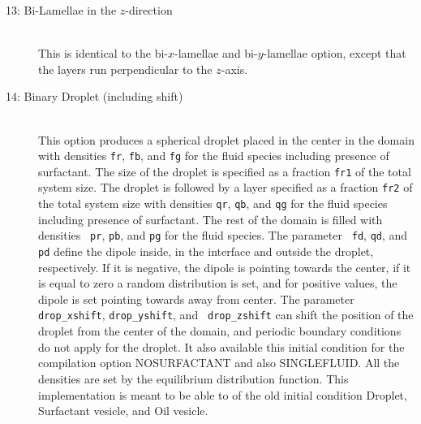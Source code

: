 \documentclass[a4paper]{article}
\begin{document}
\begin{description}
\item[13: Bi-Lamellae in the $z$-direction]\ \\
  This is identical to the bi-$x$-lamellae and bi-$y$-lamellae option, except
  that the layers run perpendicular to the $z$-axis.

\item[14: Binary Droplet (including shift)]\ \\
  This option produces a spherical droplet placed in the center in the domain
  with densities {\tt fr}, {\tt fb}, and {\tt fg} for the fluid species
  including presence of surfactant. The size of the droplet is specified as a
  fraction {\tt fr1} of the total system size. The droplet is followed by a
  layer specified as a fraction {\tt fr2} of the total system size with
  densities {\tt qr}, {\tt qb}, and {\tt qg} for the fluid species including
  presence of surfactant. The rest of the domain is filled with densities {\tt
    pr}, {\tt pb}, and {\tt pg} for the fluid species.  The parameter {\tt
    fd}, {\tt qd}, and {\tt pd} define the dipole inside, in the interface and
  outside the droplet, respectively. If it is negative, the dipole is pointing
  towards the center, if it is equal to zero a random distribution is set, and
  for positive values, the dipole is set pointing towards away from
  center. The parameter {\tt drop\_xshift}, {\tt drop\_yshift}, and {\tt
    drop\_zshift} can shift the position of the droplet from the center of the
  domain, and periodic boundary conditions do not apply for the droplet.  It
  also available this initial condition for the compilation option
  NOSURFACTANT and also SINGLEFLUID. All the densities are set by the
  equilibrium distribution function. This implementation is meant to be able
  to of the old initial condition Droplet, Surfactant vesicle, and Oil
  vesicle.




\end{description}
\end{document}
